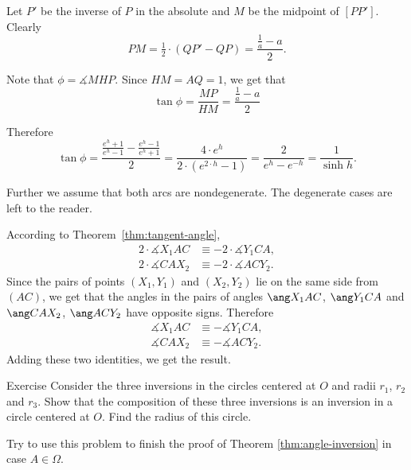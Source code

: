 {Let $P'$ be the inverse of $P$ in the absolute
and $M$ be the midpoint of $[PP']$.
Clearly 
$$PM=\tfrac12\cdot(QP'-QP)=\frac{\frac1a-a}{2}.$$

Note that $\phi=\measuredangle MHP$.
Since $HM=AQ=1$, we get that
$$\tan\phi=\frac{MP}{HM}=\frac{\frac1a-a}{2}$$


Therefore
$$\tan \phi
=\frac{\frac{e^h+1}{e^h-1}-\frac{e^h-1}{e^h+1}}2
=\frac{4\cdot e^{h}}{2\cdot( e^{2\cdot h}-1)}
=\frac{2}{e^{h}-e^{-h}}=\frac1{\sinh h}.$$
\qedsf












Further we assume that both arcs are nondegenerate.
The degenerate cases are left to the reader.

According to Theorem~\ref{thm:tangent-angle},
\begin{align*}
2\cdot \measuredangle X_1AC
&\equiv -2\cdot \measuredangle Y_1CA,
\\
2\cdot \measuredangle CAX_2
&\equiv -2\cdot \measuredangle ACY_2.
\end{align*}
Since the pairs of points $(X_1, Y_1)$ and $(X_2, Y_2)$
lie on the same side from $(AC)$,
we get that the  angles in the pairs of angles 
$\ang X_1AC$, $\ang Y_1CA$ 
and $\ang CAX_2$, $\ang ACY_2$
have opposite signs.
Therefore 
\begin{align*}
\measuredangle X_1AC
&\equiv - \measuredangle Y_1CA,
\\
 \measuredangle CAX_2
&\equiv - \measuredangle ACY_2.
\end{align*}
Adding these two identities, we get the result.
\qeds








\begin{thm}{Exercise}\label{ex:3-inversions}
Consider the three inversions
in the circles centered at $O$ and radii $r_1$, $r_2$ and $r_3$.
Show that the composition of these three inversions is an inversion in a circle centered at $O$.
Find the radius of this circle.

Try to use this problem to finish the proof of Theorem \ref{thm:angle-inversion} in case $A\in\Omega$.
\end{thm}







}
